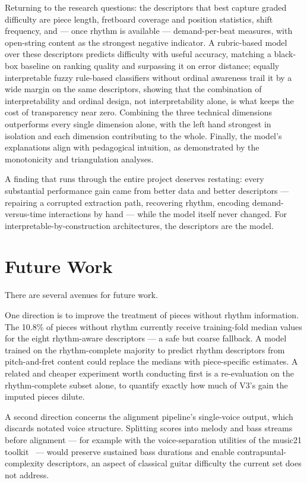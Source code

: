Returning to the research questions: the descriptors that best capture graded difficulty are piece length, fretboard coverage and position statistics, shift frequency, and --- once rhythm is available --- demand-per-beat measures, with open-string content as the strongest negative indicator. A rubric-based model over these descriptors predicts difficulty with useful accuracy, matching a black-box baseline on ranking quality and surpassing it on error distance; equally interpretable fuzzy rule-based classifiers without ordinal awareness trail it by a wide margin on the same descriptors, showing that the combination of interpretability and ordinal design, not interpretability alone, is what keeps the cost of transparency near zero. Combining the three technical dimensions outperforms every single dimension alone, with the left hand strongest in isolation and each dimension contributing to the whole. Finally, the model's explanations align with pedagogical intuition, as demonstrated by the monotonicity and triangulation analyses.

A finding that runs through the entire project deserves restating: every substantial performance gain came from better data and better descriptors --- repairing a corrupted extraction path, recovering rhythm, encoding demand-versus-time interactions by hand --- while the model itself never changed. For interpretable-by-construction architectures, the descriptors are the model.

\section{Future Work}
\label{sec:future_work}
There are several avenues for future work.

One direction is to improve the treatment of pieces without rhythm information. The 10.8\% of pieces without rhythm currently receive training-fold median values for the eight rhythm-aware descriptors --- a safe but coarse fallback. A model trained on the rhythm-complete majority to predict rhythm descriptors from pitch-and-fret content could replace the medians with piece-specific estimates. A related and cheaper experiment worth conducting first is a re-evaluation on the rhythm-complete subset alone, to quantify exactly how much of V3's gain the imputed pieces dilute.

A second direction concerns the alignment pipeline's single-voice output, which discards notated voice structure. Splitting scores into melody and bass streams before alignment --- for example with the voice-separation utilities of the music21 toolkit~\cite{cuthbert2010music21} --- would preserve sustained bass durations and enable contrapuntal-complexity descriptors, an aspect of classical guitar difficulty the current set does not address.

